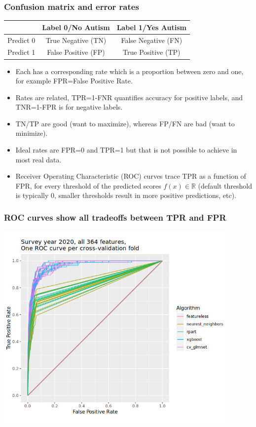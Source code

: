 \documentclass{beamer}
\begin{document}
\begin{frame}
  \frametitle{Confusion matrix and error rates}
  \begin{tabular}{c|c|c}
    & Label 0/No Autism            & Label 1/Yes Autism \\
    \hline
    Predict 0 & True Negative (TN) & False Negative (FN) \\
    \hline
    Predict 1 & False Positive (FP)& True Positive (TP)
  \end{tabular}
  \begin{itemize}
  \item Each has a corresponding rate which is a proportion between
    zero and one, for example FPR=False Positive Rate.
  \item Rates are related, TPR=1-FNR quantifies accuracy for positive
    labels, and TNR=1-FPR is for negative labels.
  \item TN/TP are good (want to maximize), whereas FP/FN are bad (want
    to minimize).
  \item Ideal rates are FPR=0 and TPR=1 but that is not possible to
    achieve in most real data.
  \item Receiver Operating Characteristic (ROC) curves trace TPR as a
    function of FPR, for every threshold of the predicted scores
    $f(x)\in\mathbb R$ (default threshold is typically 0, smaller
    thresholds result in more positive predictions, etc).
  \end{itemize}
\end{frame}

\begin{frame}
  \frametitle{ROC curves show all tradeoffs between TPR and FPR}
  \includegraphics[width=0.9\textwidth]{download-nsch-mlr3batchmark-registry-one-set-all-features-roc.png}
\end{frame}
\end{document}
